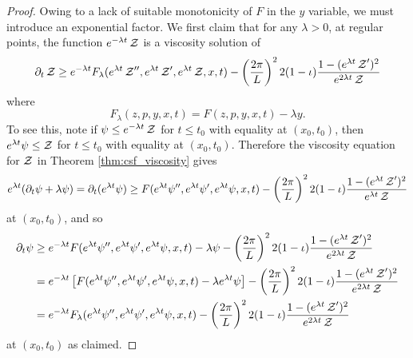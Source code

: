 \documentclass[12pt]{amsart}
\begin{document}
\begin{proof}
Owing to a lack of suitable monotonicity of $F$ in the $y$ variable, we must introduce an exponential factor. We first claim that for any $\lambda > 0$, at regular points, the function $e^{-\lambda t} \operatorname{\mathcal{Z}}$ is a viscosity solution of
\begin{equation}
\label{eq:exponential_viscosity}
\partial_t \operatorname{\mathcal{Z}} \geq e^{-\lambda t} F_{\lambda} (e^{\lambda t} \operatorname{\mathcal{Z}}'', e^{\lambda t} \operatorname{\mathcal{Z}}', e^{\lambda t} \operatorname{\mathcal{Z}}, x, t) - \left(\frac{2\pi}{L}\right)^2 2 (1-\operatorname{\iota}) \frac{1 - (e^{\lambda t} \operatorname{\mathcal{Z}}')^2}{e^{2\lambda t} \operatorname{\mathcal{Z}}}
\end{equation}
where
\[
F_{\lambda}(z, p, y, x, t) = F(z, p, y, x, t) - \lambda y.
\]
To see this, note if $\psi \leq e^{-\lambda t} \operatorname{\mathcal{Z}}$ for $t\leq t_0$ with equality at $(x_0, t_0)$, then $e^{\lambda t} \psi \leq \operatorname{\mathcal{Z}}$ for $t\leq t_0$ with equality at $(x_0, t_0)$. Therefore the viscosity equation for $\operatorname{\mathcal{Z}}$ in Theorem \ref{thm:csf_viscosity} gives
\[
e^{\lambda t} (\partial_t \psi + \lambda \psi) = \partial_t (e^{\lambda t} \psi) \geq F(e^{\lambda t} \psi'', e^{\lambda t} \psi', e^{\lambda t} \psi, x, t) - \left(\frac{2\pi}{L}\right)^2 2 (1-\operatorname{\iota}) \frac{1 - (e^{\lambda t} \operatorname{\mathcal{Z}}')^2}{e^{\lambda t} \operatorname{\mathcal{Z}}}
\]
at $(x_0, t_0)$, and so
\[
\begin{split}
\partial_t \psi &\geq e^{-\lambda t} F(e^{\lambda t} \psi'', e^{\lambda t} \psi', e^{\lambda t} \psi, x, t) - \lambda \psi - \left(\frac{2\pi}{L}\right)^2 2 (1-\operatorname{\iota}) \frac{1 - (e^{\lambda t} \operatorname{\mathcal{Z}}')^2}{e^{2\lambda t} \operatorname{\mathcal{Z}}} \\
&= e^{-\lambda t} \left[F(e^{\lambda t} \psi'', e^{\lambda t} \psi', e^{\lambda t} \psi, x, t) - \lambda e^{\lambda t} \psi\right] - \left(\frac{2\pi}{L}\right)^2 2 (1-\operatorname{\iota}) \frac{1 - (e^{\lambda t} \operatorname{\mathcal{Z}}')^2}{e^{2\lambda t} \operatorname{\mathcal{Z}}} \\
&= e^{-\lambda t} F_{\lambda}(e^{\lambda t} \psi'', e^{\lambda t} \psi', e^{\lambda t} \psi, x, t) - \left(\frac{2\pi}{L}\right)^2 2 (1-\operatorname{\iota}) \frac{1 - (e^{\lambda t} \operatorname{\mathcal{Z}}')^2}{e^{2\lambda t} \operatorname{\mathcal{Z}}}
\end{split}
\]
at $(x_0, t_0)$ as claimed.


\end{proof}
\end{document}
